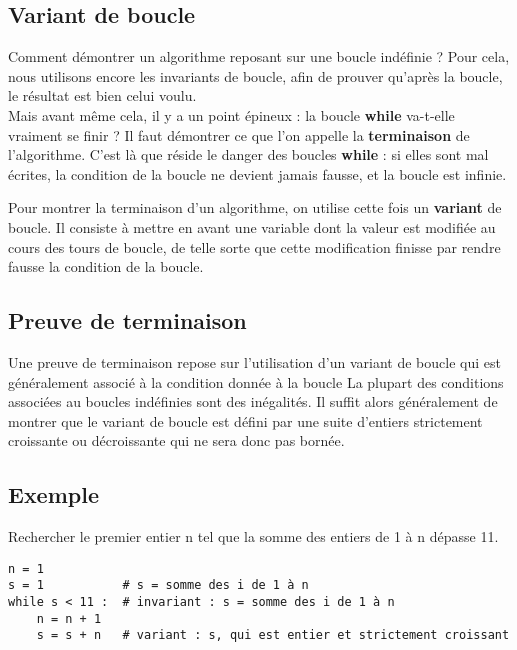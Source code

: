 \subsection{Variant de boucle}

Comment démontrer un 
algorithme reposant sur une boucle indéfinie ? Pour cela, nous utilisons encore les invariants de 
boucle, afin de prouver qu'après la boucle, le résultat est bien celui voulu.\\
Mais avant même cela, il y a un point épineux : la boucle \textbf{while} va-t-elle vraiment se 
finir ? Il faut démontrer ce que l'on appelle la \textbf{terminaison} de l'algorithme. C'est là que 
réside le danger des boucles \textbf{while} : si elles sont mal écrites, la condition de la boucle 
ne devient jamais fausse, et la boucle est infinie.\\

\begin{defi}
Pour montrer la terminaison d'un algorithme, on utilise cette fois un \textbf{variant} de boucle. 
Il consiste à mettre en avant une variable dont la valeur est modifiée au cours des tours de 
boucle, de telle sorte que cette modification finisse par rendre fausse la condition de la boucle.\\
\end{defi}


\subsection{Preuve de terminaison}


\begin{defi}
Une preuve de terminaison repose sur l'utilisation d'un variant de boucle qui est généralement associé à la condition donnée à la boucle  La plupart des conditions associées au boucles indéfinies sont des inégalités. Il suffit alors généralement de montrer que le variant de boucle est défini par une suite d'entiers strictement croissante ou décroissante qui ne sera donc pas bornée.
\end{defi}

\subsection{Exemple}


\begin{exemple}
Rechercher le premier entier n tel que la somme des entiers de 1 à n dépasse 11.

\begin{lstlisting}
n = 1
s = 1           # s = somme des i de 1 à n
while s < 11 :  # invariant : s = somme des i de 1 à n
    n = n + 1
    s = s + n   # variant : s, qui est entier et strictement croissant
\end{lstlisting}
\end{exemple}